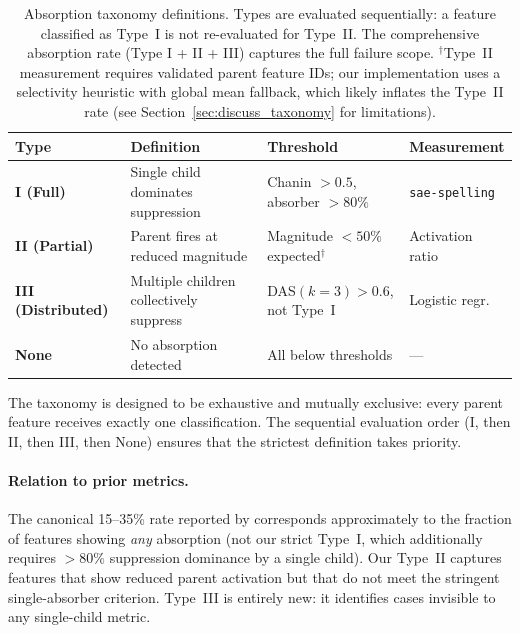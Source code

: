 \documentclass{article}
\begin{document}
\begin{table}[t]
  \caption{Absorption taxonomy definitions. Types are evaluated sequentially: a feature classified as Type~I is not re-evaluated for Type~II. The comprehensive absorption rate (Type I + II + III) captures the full failure scope. $^\dagger$Type~II measurement requires validated parent feature IDs; our implementation uses a selectivity heuristic with global mean fallback, which likely inflates the Type~II rate (see Section~\ref{sec:discuss_taxonomy} for limitations).}
  \label{tab:taxonomy_def}
  \centering
  \footnotesize
  \begin{tabular}{@{}lp{2.7cm}p{3.2cm}l@{}}
    \toprule
    Type & Definition & Threshold & Measurement \\
    \midrule
    \textbf{I (Full)} & Single child dominates suppression & Chanin $> 0.5$, absorber $> 80\%$ & \texttt{sae-spelling} \\
    \textbf{II (Partial)} & Parent fires at reduced magnitude & Magnitude $< 50\%$ expected$^\dagger$ & Activation ratio \\
    \textbf{III (Distributed)} & Multiple children collectively suppress & DAS$(k{=}3) > 0.6$, not Type~I & Logistic regr. \\
    \textbf{None} & No absorption detected & All below thresholds & --- \\
    \bottomrule
  \end{tabular}
\end{table}

The taxonomy is designed to be exhaustive and mutually exclusive: every parent feature receives exactly one classification. The sequential evaluation order (I, then II, then III, then None) ensures that the strictest definition takes priority.

\paragraph{Relation to prior metrics.} The canonical 15--35\% rate reported by \citet{chanin2024absorption} corresponds approximately to the fraction of features showing \emph{any} absorption (not our strict Type~I, which additionally requires $> 80\%$ suppression dominance by a single child). Our Type~II captures features that show reduced parent activation but that do not meet the stringent single-absorber criterion. Type~III is entirely new: it identifies cases invisible to any single-child metric.


\end{document}
